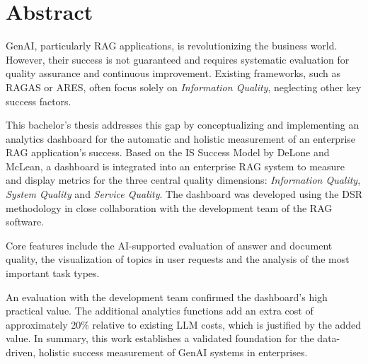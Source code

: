 \documentclass[
	english,
	ruledheaders=section,%
	class=report,%
	thesis={type=bachelor},%
	accentcolor=1b,%
	custommargins=true,%
	marginpar=false,%
	parskip=half-,%
	fontsize=11pt,%
	DIV=14,
]{tudapub}
\begin{document}
\chapter*{Abstract}

GenAI, particularly RAG applications, is revolutionizing the business world. However, their success is not guaranteed and requires systematic evaluation for quality assurance and continuous improvement. Existing frameworks, such as RAGAS or ARES, often focus solely on \textit{Information Quality}, neglecting other key success factors.

This bachelor's thesis addresses this gap by conceptualizing and implementing an analytics dashboard for the automatic and holistic measurement of an enterprise RAG application's success. Based on the IS Success Model by DeLone and McLean, a dashboard is integrated into an enterprise RAG system to measure and display metrics for the three central quality dimensions: \textit{Information Quality}, \textit{System Quality} and \textit{Service Quality}. The dashboard was developed using the DSR methodology in close collaboration with the development team of the RAG software.

Core features include the AI-supported evaluation of answer and document quality, the visualization of topics in user requests and the analysis of the most important task types.

An evaluation with the development team confirmed the dashboard's high practical value. The additional analytics functions add an extra cost of approximately 20\% relative to existing LLM costs, which is justified by the added value. In summary, this work establishes a validated foundation for the data-driven, holistic success measurement of GenAI systems in enterprises.
\tableofcontents




\listoffigures
{}           %
\end{document}
